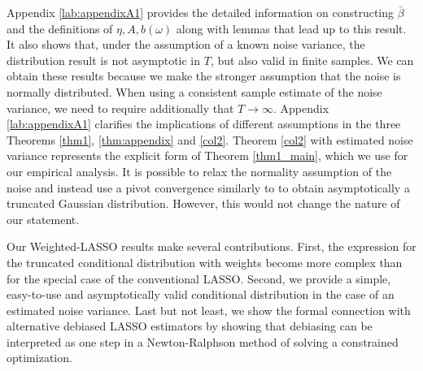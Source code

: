 \documentclass[11pt]{article}
\def\cmt#1{{\textcolor{red}{(#1)}}}
\begin{document}
	Appendix \ref{lab:appendixA1} provides the detailed information on constructing $\bar{\beta}$ and the definitions of $\eta, A, b(\omega)$ along with lemmas that lead up to this result. It also shows that, under the assumption of a known noise variance, the distribution result is not asymptotic in $T$, but also valid in finite samples. We can obtain these results because we make the stronger assumption that the noise is normally distributed. When using a consistent sample estimate of the noise variance, we need to require additionally that $T \rightarrow \infty$. Appendix \ref{lab:appendixA1} clarifies the implications of different assumptions in the three Theorems \ref{thm1}, \ref{thm:appendix} and \ref{col2}. Theorem \ref{col2} with estimated noise variance represents the explicit form of Theorem \ref{thm1_main}, which we use for our empirical analysis. 
	It is possible to relax the normality assumption of the noise and instead use a pivot convergence similarly to \cite{tian2017asymptotics} to obtain asymptotically a truncated Gaussian distribution. However, this would not change the nature of our statement.    
	
	
	
	Our Weighted-LASSO results make several contributions. First, the expression for the truncated conditional distribution with weights become more complex than for the special case of the conventional LASSO. Second, we provide a simple, easy-to-use and asymptotically valid conditional distribution in the case of an estimated noise variance. Last but not least, we show the formal connection with alternative debiased LASSO estimators by showing that debiasing can be interpreted as one step in a Newton-Ralphson method of solving a constrained optimization.
	
	
	
\end{document}
